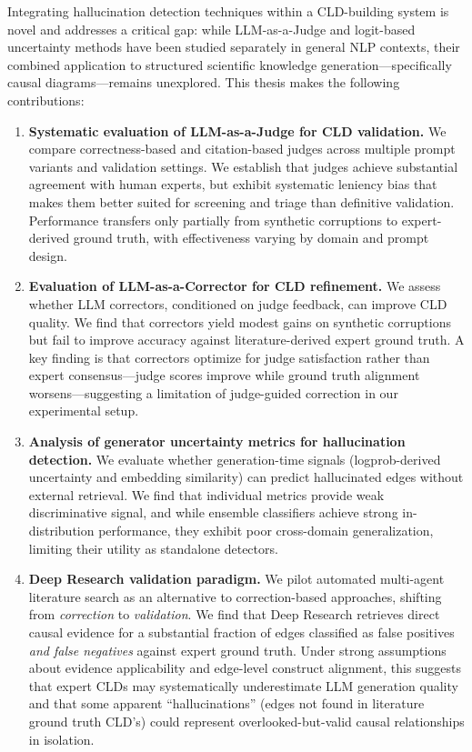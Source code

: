 Integrating hallucination detection techniques within a CLD-building system is novel and addresses a critical gap: while LLM-as-a-Judge and logit-based uncertainty methods have been studied separately in general NLP contexts, their combined application to structured scientific knowledge generation---specifically causal diagrams---remains unexplored. This thesis makes the following contributions:

\begin{enumerate}
    \item \textbf{Systematic evaluation of LLM-as-a-Judge for CLD validation.} We compare correctness-based and citation-based judges across multiple prompt variants and validation settings. We establish that judges achieve substantial agreement with human experts, but exhibit systematic leniency bias that makes them better suited for screening and triage than definitive validation. Performance transfers only partially from synthetic corruptions to expert-derived ground truth, with effectiveness varying by domain and prompt design.
    
    \item \textbf{Evaluation of LLM-as-a-Corrector for CLD refinement.} We assess whether LLM correctors, conditioned on judge feedback, can improve CLD quality. We find that correctors yield modest gains on synthetic corruptions but fail to improve accuracy against literature-derived expert ground truth. A key finding is that correctors optimize for judge satisfaction rather than expert consensus---judge scores improve while ground truth alignment worsens---suggesting a limitation of judge-guided correction in our experimental setup.
    
    \item \textbf{Analysis of generator uncertainty metrics for hallucination detection.} We evaluate whether generation-time signals (logprob-derived uncertainty and embedding similarity) can predict hallucinated edges without external retrieval. We find that individual metrics provide weak discriminative signal, and while ensemble classifiers achieve strong in-distribution performance, they exhibit poor cross-domain generalization, limiting their utility as standalone detectors.
    
    \item \textbf{Deep Research validation paradigm.} We pilot automated multi-agent literature search as an alternative to correction-based approaches, shifting from \emph{correction} to \emph{validation}. We find that Deep Research retrieves direct causal evidence for a substantial fraction of edges classified as false positives \emph{and false negatives} against expert ground truth. Under strong assumptions about evidence applicability and edge-level construct alignment, this suggests that expert CLDs may systematically underestimate LLM generation quality and that some apparent ``hallucinations'' (edges not found in literature ground truth CLD's) could represent overlooked-but-valid causal relationships in isolation.
    

\end{enumerate}

